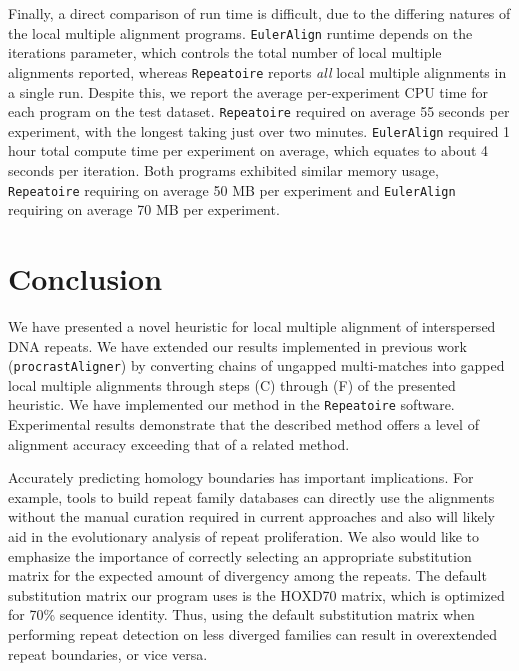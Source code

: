 \documentclass[12pt,journal,letterpaper,onecolumn, draftcls]{IEEEtran}
\begin{document}


Finally, a direct comparison of run time is difficult, due to the differing natures of the local multiple alignment programs.  \texttt{EulerAlign} runtime depends on the iterations parameter, which controls the total number of local multiple alignments reported, whereas \texttt{Repeatoire} reports \textit{all} local multiple alignments in a single run.  Despite this, we report the average per-experiment CPU time for each program on the test dataset. \texttt{Repeatoire} required on average 55 seconds per experiment, with the longest taking just over two minutes. \texttt{EulerAlign} required 1 hour total compute time per experiment on average, which equates to about 4 seconds per iteration.  Both programs exhibited similar memory usage, \texttt{Repeatoire} requiring on average 50 MB per experiment and \texttt{EulerAlign} requiring on average 70 MB per experiment.


\section{Conclusion}
We have presented a novel heuristic for local multiple alignment of interspersed DNA repeats. We have extended our results implemented in previous work (\texttt{procrastAligner}) by
converting chains of ungapped multi-matches into gapped local multiple
alignments through steps (C) through (F) of the presented heuristic. We have implemented our method in the \texttt{Repeatoire} software. Experimental results demonstrate that the
described method offers a level of alignment accuracy exceeding
that of a related method.

Accurately predicting homology boundaries has important implications. For example, tools to build repeat family databases can directly use the alignments without the manual curation required in current approaches and also will likely aid in the evolutionary analysis of repeat proliferation.  We also would like to emphasize the importance of correctly selecting an appropriate substitution matrix for the expected amount of divergency among the repeats. The default substitution matrix our program uses is the HOXD70 matrix, which is optimized for 70\% sequence identity. Thus, using the default substitution matrix when performing repeat detection on less diverged families can result in overextended repeat boundaries, or vice versa.
\end{document}
